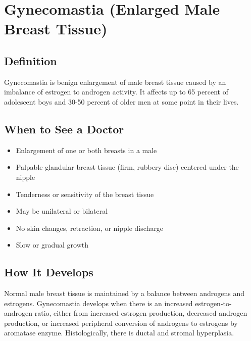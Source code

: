 \chapter{Gynecomastia (Enlarged Male Breast Tissue)}

\section*{Definition}
Gynecomastia is benign enlargement of male breast tissue caused by an imbalance of estrogen to androgen activity. It affects up to 65 percent of adolescent boys and 30-50 percent of older men at some point in their lives.

\section*{When to See a Doctor}
\begin{itemize}
\item Enlargement of one or both breasts in a male
\item Palpable glandular breast tissue (firm, rubbery disc) centered under the nipple
\item Tenderness or sensitivity of the breast tissue
\item May be unilateral or bilateral
\item No skin changes, retraction, or nipple discharge
\item Slow or gradual growth
\end{itemize}

\section*{How It Develops}
Normal male breast tissue is maintained by a balance between androgens and estrogens. Gynecomastia develops when there is an increased estrogen-to-androgen ratio, either from increased estrogen production, decreased androgen production, or increased peripheral conversion of androgens to estrogens by aromatase enzyme. Histologically, there is ductal and stromal hyperplasia.

